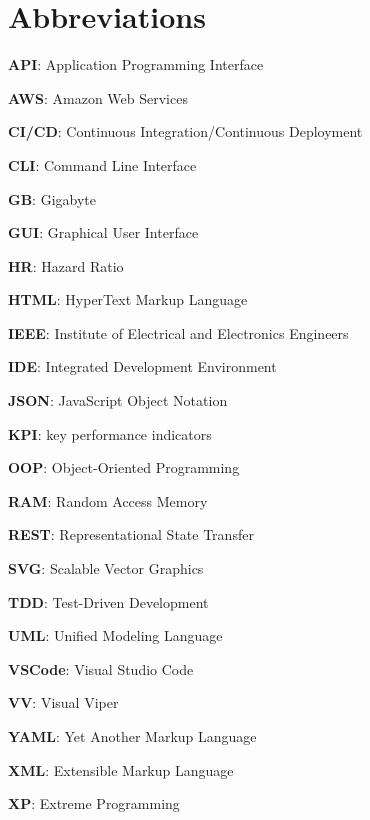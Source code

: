 \section{Abbreviations}\label{abbreviations}

\textbf{API}: Application Programming Interface

\textbf{AWS}: Amazon Web Services

\textbf{CI/CD}: Continuous Integration/Continuous Deployment

\textbf{CLI}: Command Line Interface

\textbf{GB}: Gigabyte

\textbf{GUI}: Graphical User Interface

\textbf{HR}: Hazard Ratio

\textbf{HTML}: HyperText Markup Language

\textbf{IEEE}: Institute of Electrical and Electronics Engineers

\textbf{IDE}: Integrated Development Environment

\textbf{JSON}: JavaScript Object Notation

\textbf{KPI}: key performance indicators

\textbf{OOP}: Object-Oriented Programming

\textbf{RAM}: Random Access Memory

\textbf{REST}: Representational State Transfer

\textbf{SVG}: Scalable Vector Graphics

\textbf{TDD}: Test-Driven Development

\textbf{UML}: Unified Modeling Language

\textbf{VSCode}: Visual Studio Code

\textbf{VV}: Visual Viper

\textbf{YAML}: Yet Another Markup Language

\textbf{XML}: Extensible Markup Language

\textbf{XP}: Extreme Programming
